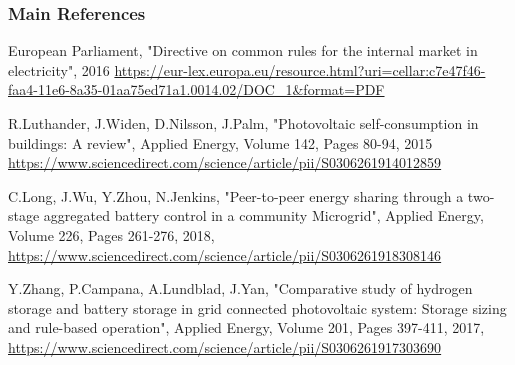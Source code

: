 \documentclass[xcolor=dvipsnames,aspectratio=169]{beamer} %
\begin{document}
\begin{frame}[noframenumbering]

\frametitle{Main References}

\begin{minipage}{0.9\paperwidth}

\vspace{-24pt}

\begin{thebibliography}{00}

\footnotesize

 European Parliament, "Directive on common rules for the internal market in electricity", 2016 \url{https://eur-lex.europa.eu/resource.html?uri=cellar:c7e47f46-faa4-11e6-8a35-01aa75ed71a1.0014.02/DOC_1&format=PDF}

 R.Luthander, J.Widen, D.Nilsson, J.Palm, "Photovoltaic self-consumption in buildings: A review", Applied Energy, Volume 142, Pages 80-94, 2015 \url{https://www.sciencedirect.com/science/article/pii/S0306261914012859}

 C.Long, J.Wu, Y.Zhou, N.Jenkins, "Peer-to-peer energy sharing through a two-stage aggregated battery control in a community Microgrid", Applied Energy, Volume 226,
Pages 261-276, 2018, \url{https://www.sciencedirect.com/science/article/pii/S0306261918308146}

 Y.Zhang, P.Campana, A.Lundblad, J.Yan, "Comparative study of hydrogen storage and battery storage in grid connected photovoltaic system: Storage sizing and rule-based operation", Applied Energy, Volume 201, Pages 397-411, 2017, \url{https://www.sciencedirect.com/science/article/pii/S0306261917303690}

\end{thebibliography}

\normalsize

\end{minipage}

\end{frame}
\end{document}
